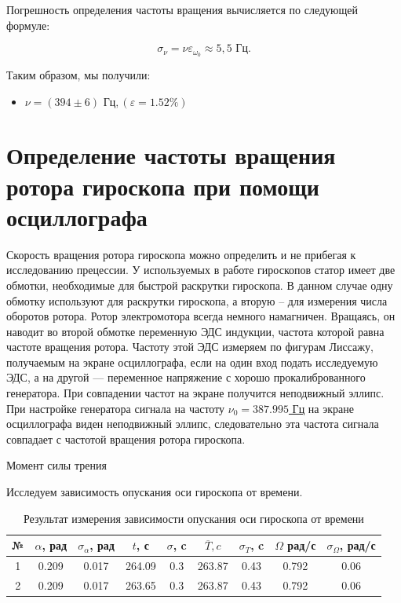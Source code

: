 \documentclass[12pt, a4paper]{article}
\begin{document}
Погрешность определения частоты вращения вычисляется по следующей формуле:

\begin{equation}
\sigma_\nu = \nu \varepsilon_{\omega_0} \approx 5,5 \text{ Гц}.
\end{equation}

Таким образом, мы получили:

\begin{itemize}
	\item \underline{$ \nu = \left( 394 \pm 6 \right) \text{ Гц}, \left( \varepsilon = 1.52 \% \right)   $}
\end{itemize}

\section{Определение частоты вращения ротора гироскопа при помощи осциллографа}

Скорость вращения ротора гироскопа можно определить и не прибегая к исследованию прецессии. 
У используемых в работе гироскопов статор имеет две обмотки, необходимые для быстрой раскрутки гироскопа. 
В данном случае одну обмотку используют для раскрутки гироскопа, а вторую -- для измерения числа оборотов ротора. 
Ротор электромотора всегда немного намагничен. Вращаясь, он наводит во второй обмотке переменную ЭДС индукции, частота которой равна частоте вращения ротора. 
Частоту этой ЭДС измеряем по фигурам Лиссажу, получаемым на экране осциллографа, если на один вход подать исследуемую ЭДС, а на другой — переменное напряжение с хорошо прокалиброванного генератора. 
При совпадении частот на экране получится неподвижный эллипс.\\
При настройке генератора сигнала на частоту \underline{$ \nu_0 = 387.995$ Гц} на экране осциллографа виден  неподвижный эллипс, следовательно эта частота сигнала совпадает с частотой вращения ротора гироскопа.

\vspace*{0.3cm}

{\large Момент силы трения}

Исследуем зависимость опускания оси гироскопа от времени.

\begin{table}[h!]
	\centering
	\begin{tabular}{|c|c|c|c|c|c|c|c|c|}
		\hline
	№  & $\alpha$, рад & $\sigma_{\alpha}$, рад & $t$, с & $\sigma$, c & $\overline{T}, c$ & $\sigma_T$, c & $\varOmega$ рад/с & $\sigma_{\varOmega}$, рад/с	\\ \hline
	1  & 0.209 & 0.017 & 264.09 & 0.3 & 263.87 & 0.43 & 0.792 & 0.06 \\ \hline
	2  & 0.209 & 0.017 & 263.65 & 0.3 & 263.87 & 0.43 & 0.792 & 0.06 \\ \hline
	\end{tabular}
	\caption{Результат измерения зависимости опускания оси гироскопа от времени}
\end{table}
\end{document}
